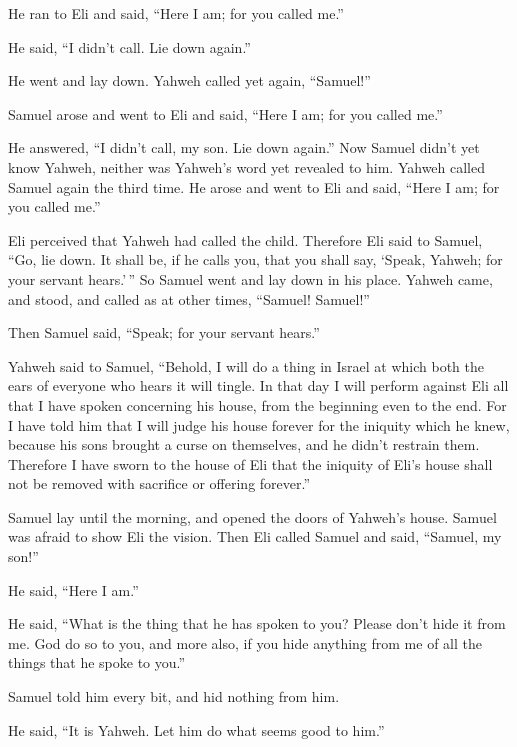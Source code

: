  He ran to Eli and said, ``Here I am; for you called me.''

He said, ``I didn't call. Lie down again.''

He went and lay down.  Yahweh called yet again,
``Samuel!''

Samuel arose and went to Eli and said, ``Here I am; for you called me.''

He answered, ``I didn't call, my son. Lie down again.'' 
Now Samuel didn't yet know Yahweh, neither was Yahweh's word yet
revealed to him.  Yahweh called Samuel again the third
time. He arose and went to Eli and said, ``Here I am; for you called
me.''

Eli perceived that Yahweh had called the child.  Therefore
Eli said to Samuel, ``Go, lie down. It shall be, if he calls you, that
you shall say, `Speak, Yahweh; for your servant hears.'\,'' So Samuel
went and lay down in his place.  Yahweh came, and stood,
and called as at other times, ``Samuel! Samuel!''

Then Samuel said, ``Speak; for your servant hears.''

 Yahweh said to Samuel, ``Behold, I will do a thing in
Israel at which both the ears of everyone who hears it will tingle.
 In that day I will perform against Eli all that I have
spoken concerning his house, from the beginning even to the end.
 For I have told him that I will judge his house forever
for the iniquity which he knew, because his sons brought a curse on
themselves, and he didn't restrain them.  Therefore I
have sworn to the house of Eli that the iniquity of Eli's house shall
not be removed with sacrifice or offering forever.''

 Samuel lay until the morning, and opened the doors of
Yahweh's house. Samuel was afraid to show Eli the vision.
 Then Eli called Samuel and said, ``Samuel, my son!''

He said, ``Here I am.''

 He said, ``What is the thing that he has spoken to you?
Please don't hide it from me. God do so to you, and more also, if you
hide anything from me of all the things that he spoke to you.''

 Samuel told him every bit, and hid nothing from him.

He said, ``It is Yahweh. Let him do what seems good to him.''

